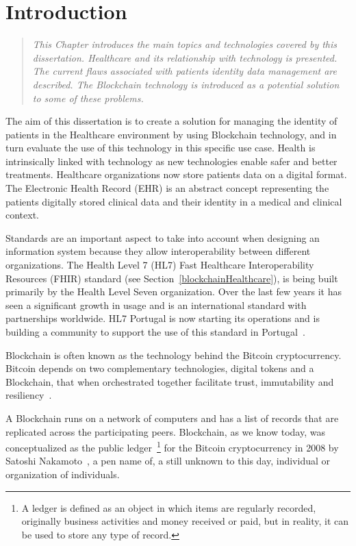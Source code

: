 \chapter{Introduction}
\label{introduction}

\begin{quote} 
  \emph{This Chapter introduces the main topics and technologies covered by
  this dissertation. Healthcare and its relationship with technology is
  presented. The current flaws associated with patients identity data
  management are described. The Blockchain technology is introduced as a
  potential solution to some of these problems.} 
\end{quote}

The aim of this dissertation is to create a solution for managing the identity
of patients in the Healthcare environment by using Blockchain technology, and
in turn evaluate the use of this technology in this specific use case.  Health
is intrinsically linked with technology as new technologies enable safer and
better treatments. Healthcare organizations now store patients data on a
digital format. The Electronic Health Record (EHR) is an abstract concept
representing the patients digitally stored clinical data and their identity in
a medical and clinical context.

Standards are an important aspect to take into account when designing an
information system because they allow interoperability between different
organizations. The Health Level 7 (HL7) Fast Healthcare Interoperability
Resources (FHIR) standard (see Section~\ref{blockchainHealthcare}), is being
built primarily by the Health Level Seven organization. Over the last few years
it has seen a significant growth in usage and is an international standard with
partnerships worldwide. HL7 Portugal is now starting its operations and is
building a community to support the use of this standard in
Portugal~\cite{HealthLevel7}.

Blockchain is often known as the technology behind the Bitcoin cryptocurrency.
Bitcoin depends on two complementary technologies, digital tokens and a
Blockchain, that when orchestrated together facilitate trust, immutability and
resiliency~\cite{Evans2016}.

A Blockchain runs on a network of computers and has a list of records that are
replicated across the participating peers. Blockchain, as we know today, was
conceptualized as the public ledger~\footnote{A ledger is defined as an object
in which items are regularly recorded, originally business activities and money
received or paid, but in reality, it can be used to store any type of record.}
for the Bitcoin cryptocurrency in 2008 by Satoshi Nakamoto~\cite{Nakamoto2008},
a pen name of, a still unknown to this day, individual or organization of
individuals.

